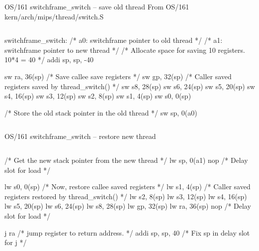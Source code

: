 \documentclass[11pt,aspectratio=169]{beamer}
\begin{document}



\begin{slide}{OS/161 switchframe\_switch -- save old thread}
From OS/161 kern/arch/mips/thread/switch.S
\begin{columns}
\begin{smallccode}[numbers=left]
switchframe_switch:
  /* a0: switchframe pointer to old thread */
  /* a1: switchframe pointer to new thread */
  /* Allocate space for saving 10 registers. 10*4 = 40 */
  addi sp, sp, -40

  sw ra, 36(sp) /* Save callee save registers */
  sw gp, 32(sp) /* Caller saved registers saved by thread_switch() */
  sw s8, 28(sp)
  sw s6, 24(sp)
  sw s5, 20(sp)
  sw s4, 16(sp)
  sw s3, 12(sp)
  sw s2, 8(sp)
  sw s1, 4(sp)
  sw s0, 0(sp)

  /* Store the old stack pointer in the old thread */
  sw sp, 0(a0)
\end{smallccode}
\end{columns}
\end{slide}

\begin{slide}{OS/161 switchframe\_switch -- restore new thread}
  \vspace{-1.7em}
  \begin{columns}
  \begin{smallccode}[numbers=left]
    /* Get the new stack pointer from the new thread */
    lw sp, 0(a1)
    nop /* Delay slot for load */
  
    lw s0, 0(sp) /* Now, restore callee saved registers */
    lw s1, 4(sp) /* Caller saved registers restored by thread_switch() */
    lw s2, 8(sp)
    lw s3, 12(sp)
    lw s4, 16(sp)
    lw s5, 20(sp)
    lw s6, 24(sp)
    lw s8, 28(sp)
    lw gp, 32(sp)
    lw ra, 36(sp)
    nop /* Delay slot for load */
  
    j ra /* jump register to return address. */
    addi sp, sp, 40 /* Fix sp in delay slot for j */
  \end{smallccode}
\end{columns}
\end{slide}
\end{document}
